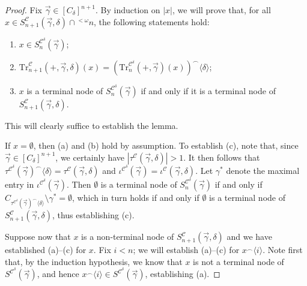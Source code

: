 \documentclass{amsart}
\numberwithin{theorem}{section}
\theoremstyle{definition}
\newcommand{\mc}{\mathcal}
\newcommand{\Tr}{\mathrm{Tr}}
\begin{document}
\begin{proof}
  Fix $\vec{\gamma} \in [C_\delta]^{n+1}$.
  By induction on $|x|$, we will prove that, for all $x \in 
  S^{\mc{C}}_{n+1}(\vec{\gamma},\delta) \cap {^{<\omega}}n$, the following 
  statements hold:
  \begin{enumerate}[label = (\alph*)]
    \item $x \in S^{\mc{C}^\delta}_n(\vec{\gamma})$;
    \item $\Tr^{\mc{C}}_{n+1}(+,\vec{\gamma},\delta)(x) = 
      (\Tr^{\mc{C}^\delta}_n(+,\vec{\gamma})(x))^\frown \langle 
      \delta \rangle$;
    \item $x$ is a terminal node of $S^{\mc{C}^\delta}_n(\vec{\gamma})$ 
    if and only if it is a terminal node of $S^{\mc{C}}_{n+1}(\vec{\gamma},\delta)$.
  \end{enumerate}
  This will clearly suffice to establish the lemma.
  
  If $x = \emptyset$, then (a) and (b) hold by assumption. To establish 
  (c), note that, since $\vec{\gamma} \in [C_\delta]^{n+1}$, we certainly 
  have $|\tau^{\mc{C}}(\vec{\gamma},\delta)| > 1$. It then follows that 
  $\tau^{\mc{C}^\delta}(\vec{\gamma})^\frown \langle \delta \rangle = 
  \tau^{\mc{C}}(\vec{\gamma},\delta)$ and $\iota^{\mc{C}^\delta}(\vec{\gamma}) 
  = \iota^{\mc{C}}(\vec{\gamma},\delta)$. Let $\gamma^*$ denote the maximal 
  entry in $\iota^{\mc{C}^\delta}(\vec{\gamma})$.
  Then $\emptyset$ is a terminal node of $S^{\mc{C}^\delta}_n(\vec{\gamma})$ 
  if and only if $C_{\tau^{\mc{C}^\delta}(\vec\gamma)^\frown\langle \delta\rangle} \setminus \gamma^* = \emptyset$, 
  which in turn holds if and only if $\emptyset$ is a terminal node of 
  $S^{\mc{C}}_{n+1}(\vec{\gamma},\delta)$, thus establishing (c).
  
  Suppose now that $x$ is a non-terminal node of $S^{\mc{C}}_{n+1}(\vec{\gamma}, 
  \delta)$ and we have established (a)--(c) for $x$. Fix $i < n$; we will 
  establish (a)--(c) for $x^\frown \langle i \rangle$. Note first that, 
  by the induction hypothesis, we know that $x$ is not a terminal node of 
  $S^{\mc{C}^\delta}(\vec{\gamma})$, and hence $x^\frown \langle i \rangle 
  \in S^{\mc{C}^\delta}(\vec{\gamma})$, establishing (a).
  

\end{proof}
\end{document}
